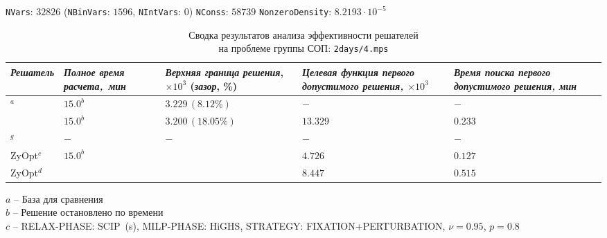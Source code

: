 \documentclass[%
	11pt,
	a4paper,
	utf8,
		]{article}
\begin{document}
\vspace*{5mm}

{
	\begin{table}[!h]
		\centering
		\caption{Сводка результатов анализа эффективности решателей\\ на проблеме группы СОП: \texttt{2days/4.mps}} 
		
		{\footnotesize \texttt{NVars}: $ 32 826 $ (\texttt{NBinVars}: $ 1596 $,  \texttt{NIntVars}: $ 0 $) \texttt{NConss}: $ 58 739 $ \texttt{NonzeroDensity}: $ 8.2193 \cdot 10^{-5} $}\\[2mm]
		
		\begin{tabular}{ p{2.9cm} | p{2.5cm} p{3.6cm} p{3.75cm} p{3.6cm} p{3.2cm} }
			\rowcolor{black!5}\emph{Решатель} & \emph{Полное время \mbox{расчета, мин}} & \emph{Верхняя граница} \mbox{\itshape решения}, $ \times 10^{3} $ (\emph{зазор}, \%) & \emph{Целевая функция первого допустимого решения, $ \times 10^3 $} & \emph{Время поиска первого допустимого решения, мин} \\
			\hline
			\rowcolor{blue!3}{CPLEX 12.8.0.0}$ ^a $ & $ 15.0^b $ & $ 3.229 \, (8.12\%) $ & $ - $ & $ - $ \\
			\rowcolor{black!5}{SCIP 8.0.3} & $15.0^b $ & $ 3.200 \, (18.05\%) $ & $ 13.329 $ & $ 0.233 $ \\
			\rowcolor{blue!3}{HiGHS 1.5.3}$ ^g $ & $ - $ & $ - $ & $ - $ & $ - $ \\
			\rowcolor{black!5}ZyOpt$^c $ & {$15.0^b $}  & \ccb{$ 3.345 \, (16.38\%) (-3.6\%) $} & $ 4.726 $ & $ 0.127 $ \\
			\rowcolor{blue!3}ZyOpt$^d $ & \ccg{$ 6.3^f (+58.0\%) $}  & \ccb{$ 3.627 \, (0.01\%) (-12.3\%) $} & $ 8.447 $ & $ 0.515 $ 
		\end{tabular}
	\end{table}
	\vspace*{-3mm}
	\hspace*{3mm}$ a $ -- {\footnotesize База для сравнения}\\[-7mm]
	
	\hspace*{3mm}$ b $ -- {\footnotesize Решение остановлено по времени}\\[-7mm]
	
	\hspace*{3mm}$ c $ -- {\footnotesize RELAX-PHASE: SCIP~(s), MILP-PHASE: HiGHS, STRATEGY: FIXATION+PERTURBATION, $ \nu = 0.95 $, $ p = 0.8 $}\\[-7mm]
	
}
\end{document}
